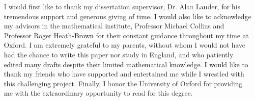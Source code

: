 \begin{acknowledgements}
I would first like to thank my dissertation supervisor, Dr. Alan Lauder, for his tremendous support and generous giving of time. I would also like to acknowledge my advisors in the mathematical institute, Professor Michael Collins and Professor Roger Heath-Brown for their constant guidance throughout my time at Oxford. I am extremely grateful to my parents, without whom I would not have had the chance to write this paper nor study in England, and who patiently edited many drafts despite their limited mathematical knowledge. I would like to thank my friends who have supported and entertained me while I wrestled with this challenging project. Finally, I honor the University of Oxford for providing me with the extraordinary opportunity to read for this degree.
\end{acknowledgements}
